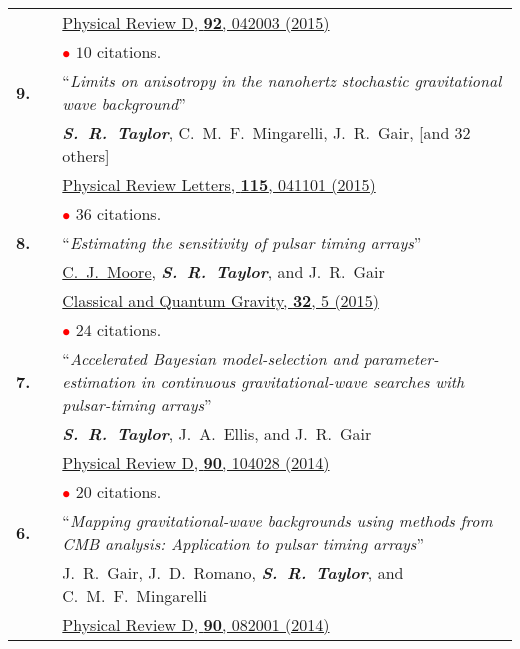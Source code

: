 \documentclass[11pt,letterpaper,sans]{moderncv}
\begin{document}
{\begin{longtable}{rp{0.3cm}p{15.8cm}}
&& \href{http://journals.aps.org/prd/abstract/10.1103/PhysRevD.92.042003}{{\color{color1} Physical Review D, \textbf{92}, 042003 (2015)}} \\
&& \textcolor{red}{$\bullet$} $10$ citations. \vspace{0.09cm}\\
\textbf{9.} & & ``\textit{Limits on anisotropy in the nanohertz stochastic gravitational wave background}'' \\ 
&& \textit{\textbf{S.~R.~Taylor}}, C.~M.~F.~Mingarelli, J.~R.~Gair, [and 32 others] \\ 
&& \href{http://journals.aps.org/prl/abstract/10.1103/PhysRevLett.115.041101}{{\color{color1} Physical Review Letters, \textbf{115}, 041101 (2015)}} \\
&& \textcolor{red}{$\bullet$} $36$ citations. \vspace{0.09cm}\\
\textbf{8.} & & ``\textit{Estimating the sensitivity of pulsar timing arrays}'' \\ 
&& \underline{C.~J.~Moore}, \textit{\textbf{S.~R.~Taylor}}, and J.~R.~Gair \\ 
&& \href{http://iopscience.iop.org/article/10.1088/0264-9381/32/5/055004/meta}{{\color{color1} Classical and Quantum Gravity, \textbf{32}, 5 (2015)}} \\
&& \textcolor{red}{$\bullet$} $24$ citations. \vspace{0.09cm}\\
\textbf{7.} & & ``\textit{Accelerated Bayesian model-selection and parameter-estimation in continuous gravitational-wave searches with pulsar-timing arrays}'' \\ 
&& \textit{\textbf{S.~R.~Taylor}}, J.~A.~Ellis, and J.~R.~Gair \\ 
&& \href{http://journals.aps.org/prd/abstract/10.1103/PhysRevD.90.104028}{{\color{color1} Physical Review D, \textbf{90}, 104028 (2014)}} \\
&& \textcolor{red}{$\bullet$} $20$ citations. \vspace{0.09cm}\\
\textbf{6.} & & ``\textit{Mapping gravitational-wave backgrounds using methods from CMB analysis: Application to pulsar timing arrays}'' \\ 
&& J.~R.~Gair, J.~D.~Romano, \textit{\textbf{S.~R.~Taylor}}, and C.~M.~F.~Mingarelli \\ 
&& \href{http://journals.aps.org/prd/abstract/10.1103/PhysRevD.90.082001}{{\color{color1} Physical Review D, \textbf{90}, 082001 (2014)}} \\

\end{longtable}}
\end{document}
